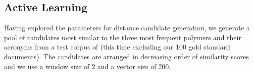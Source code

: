 

\subsection{Active Learning}
Having explored the parameters for distance candidate generation, we generate a pool of  candidates most similar to the three most frequent polymers and their acronyms from a test corpus of  (this time excluding our 100 gold standard documents). 
The candidates are arranged in decreasing order of similarity scores and we use a window size of 2 and a vector size of 200.  

